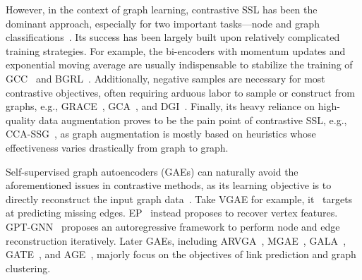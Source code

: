However, in the context of graph learning, %
contrastive SSL has been the dominant approach, especially for two important tasks---node and graph classifications~\cite{velivckovic2018deep, qiu2020gcc,hassani2020contrastive}. 
Its success has been largely built upon relatively complicated training strategies. 
For example, the bi-encoders with momentum updates and exponential moving average are usually indispensable to stabilize the training of GCC~\cite{qiu2020gcc} and BGRL~\cite{thakoor2021bootstrapped}. 
Additionally, negative samples are  necessary for most contrastive objectives, often requiring arduous labor to sample or construct from graphs, e.g., GRACE~\cite{zhu2020deep}, GCA~\cite{zhu2021graph}, and DGI~\cite{velivckovic2018deep}. 
Finally, its heavy reliance on high-quality %
data augmentation proves to be the 
pain point  
of contrastive SSL, e.g., CCA-SSG~\cite{zhang2021canonical}, as graph augmentation is mostly based on heuristics whose effectiveness varies drastically from graph to graph. 



Self-supervised graph autoencoders (GAEs) can naturally avoid the aforementioned issues in contrastive methods, as its learning objective is to directly reconstruct the input graph data~\cite{kipf2016variational,garcia2017learning}.   
Take VGAE for example, it~\cite{kipf2016variational} targets at predicting missing edges. 
EP~\cite{garcia2017learning} instead proposes to recover vertex features. 
GPT-GNN~\cite{hu2020gpt} proposes an autoregressive framework to perform node and edge reconstruction iteratively. 
Later GAEs, 
including ARVGA~\cite{pan2018adversarially}, MGAE~\cite{wang2017mgae}, GALA~\cite{park2019symmetric}, GATE~\cite{amin2020gate}, and AGE~\cite{cui2020adaptive},
majorly focus on the objectives of link prediction and graph clustering. 


